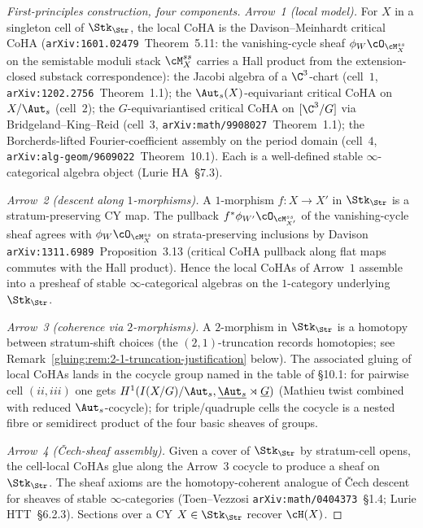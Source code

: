 \begin{proof}[First-principles construction, four components]
\emph{Arrow~1 (local model).} For $X$ in a singleton cell of
$\Stk_{\Str}$, the local CoHA is the Davison--Meinhardt critical CoHA
(\texttt{arXiv:1601.02479}~Theorem~5.11: the vanishing-cycle sheaf
$\phi_{W}\cO_{\cM^{ss}_{X}}$ on the semistable moduli stack
$\cM^{ss}_{X}$ carries a Hall product from the extension-closed
substack correspondence): the Jacobi algebra of a $\C^{3}$-chart
(cell~$1$, \texttt{arXiv:1202.2756}~Theorem~1.1); the
$\Aut_{s}(X)$-equivariant critical CoHA on $X/\Aut_{s}$ (cell~$2$);
the $G$-equivariantised critical CoHA on $[\C^{3}/G]$ via
Bridgeland--King--Reid (cell~$3$,
\texttt{arXiv:math/9908027}~Theorem~1.1); the Borcherds-lifted
Fourier-coefficient assembly on the period domain (cell~$4$,
\texttt{arXiv:alg-geom/9609022}~Theorem~10.1). Each is a well-defined
stable $\infty$-categorical algebra object (Lurie HA~\S 7.3).

\emph{Arrow~2 (descent along $1$-morphisms).} A $1$-morphism
$f:X\to X'$ in $\Stk_{\Str}$ is a stratum-preserving CY map. The
pullback $f^{*}\phi_{W'}\cO_{\cM^{ss}_{X'}}$ of the vanishing-cycle
sheaf agrees with $\phi_{W}\cO_{\cM^{ss}_{X}}$ on strata-preserving
inclusions by Davison \texttt{arXiv:1311.6989}~Proposition~3.13
(critical CoHA pullback along flat maps commutes with the Hall
product). Hence the local CoHAs of Arrow~$1$ assemble into a presheaf
of stable $\infty$-categorical algebras on the $1$-category underlying
$\Stk_{\Str}$.

\emph{Arrow~3 (coherence via $2$-morphisms).} A $2$-morphism in
$\Stk_{\Str}$ is a homotopy between stratum-shift choices (the
$(2,1)$-truncation records homotopies; see
Remark~\ref{gluing:rem:2-1-truncation-justification} below). The
associated gluing of local CoHAs lands in the cocycle group named in
the table of \S 10.1: for pairwise cell $(ii,iii)$ one gets
$H^{1}(I(X/G)/\Aut_{s},\underline{\Aut_{s}}\rtimes\underline{G})$
(Mathieu twist combined with reduced $\Aut_{s}$-cocycle); for
triple/quadruple cells the cocycle is a nested fibre or semidirect
product of the four basic sheaves of groups.

\emph{Arrow~4 (\v{C}ech-sheaf assembly).} Given a cover of $\Stk_{\Str}$
by stratum-cell opens, the cell-local CoHAs glue along the Arrow~$3$
cocycle to produce a sheaf on $\Stk_{\Str}$. The sheaf axioms are the
homotopy-coherent analogue of \v{C}ech descent for sheaves of stable
$\infty$-categories (Toen--Vezzosi \texttt{arXiv:math/0404373}~\S 1.4;
Lurie HTT~\S 6.2.3). Sections over a CY $X\in\Stk_{\Str}$ recover
$\cH(X)$.
\end{proof}

